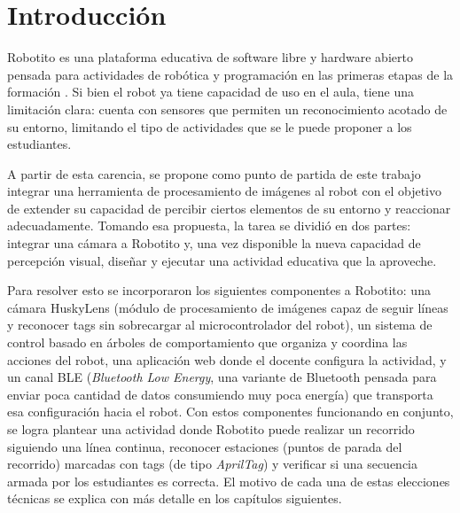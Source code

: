 \documentclass{prgrado}
\begin{document}

\mainmatter %

\chapter{Introducción}

Robotito es una plataforma educativa de software libre y hardware abierto pensada para actividades de robótica y programación en las primeras etapas de la formación \cite{tejera2019robotito}. Si bien el robot ya tiene capacidad de uso en el aula, tiene una limitación clara: cuenta con sensores que permiten un reconocimiento acotado de su entorno, limitando el tipo de actividades que se le puede proponer a los estudiantes.

A partir de esta carencia, se propone como punto de partida de este trabajo integrar una herramienta de procesamiento de imágenes al robot con el objetivo de extender su capacidad de percibir ciertos elementos de su entorno y reaccionar adecuadamente. Tomando esa propuesta, la tarea se dividió en dos partes: integrar una cámara a Robotito y, una vez disponible la nueva capacidad de percepción visual, diseñar y ejecutar una actividad educativa que la aproveche.

Para resolver esto se incorporaron los siguientes componentes a Robotito: una cámara HuskyLens (módulo de procesamiento de imágenes capaz de seguir líneas y reconocer tags sin sobrecargar al microcontrolador del robot), un sistema de control basado en árboles de comportamiento que organiza y coordina las acciones del robot, una aplicación web donde el docente configura la actividad, y un canal BLE (\textit{Bluetooth Low Energy}, una variante de Bluetooth pensada para enviar poca cantidad de datos consumiendo muy poca energía) que transporta esa configuración hacia el robot. Con estos componentes funcionando en conjunto, se logra plantear una actividad donde Robotito puede realizar un recorrido siguiendo una línea continua, reconocer estaciones (puntos de parada del recorrido) marcadas con tags (de tipo \textit{AprilTag}) y verificar si una secuencia armada por los estudiantes es correcta. El motivo de cada una de estas elecciones técnicas se explica con más detalle en los capítulos siguientes.
\end{document}

